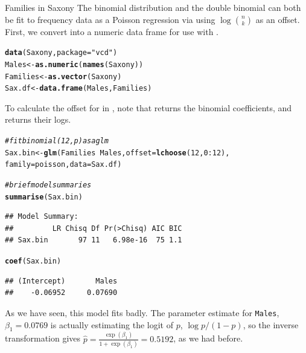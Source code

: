 \documentclass[11pt]{book}\usepackage[]{graphicx}\usepackage[]{color}
\makeatletter
\newcommand{\hlnum}[1]{\textcolor[rgb]{0.686,0.059,0.569}{#1}}%
\newcommand{\hlstr}[1]{\textcolor[rgb]{0.192,0.494,0.8}{#1}}%
\newcommand{\hlcom}[1]{\textcolor[rgb]{0.678,0.584,0.686}{\textit{#1}}}%
\newcommand{\hlopt}[1]{\textcolor[rgb]{0,0,0}{#1}}%
\newcommand{\hlstd}[1]{\textcolor[rgb]{0.345,0.345,0.345}{#1}}%
\newcommand{\hlkwb}[1]{\textcolor[rgb]{0.69,0.353,0.396}{#1}}%
\newcommand{\hlkwc}[1]{\textcolor[rgb]{0.333,0.667,0.333}{#1}}%
\newcommand{\hlkwd}[1]{\textcolor[rgb]{0.737,0.353,0.396}{\textbf{#1}}}%
\newenvironment{kframe}{%
 \def\at@end@of@kframe{}%
 \ifinner\ifhmode%
  \def\at@end@of@kframe{\end{minipage}}%
  \begin{minipage}{\columnwidth}%
 \fi\fi%
 \def\FrameCommand##1{\hskip\@totalleftmargin \hskip-\fboxsep
 \colorbox{shadecolor}{##1}\hskip-\fboxsep
     \hskip-\linewidth \hskip-\@totalleftmargin \hskip\columnwidth}%
 \MakeFramed {\advance\hsize-\width
   \@totalleftmargin\z@ \linewidth\hsize
   \@setminipage}}%
 {\par\unskip\endMakeFramed%
 \at@end@of@kframe}
\newenvironment{knitrout}{}{} %
\renewenvironment{knitrout}{\small\renewcommand{\baselinestretch}{.85}}{} %
\makeatother
\begin{document}
\begin{Example}[saxony2]{Families in Saxony}
The binomial distribution and the double binomial can both be fit to frequency data as a Poisson regression via 
using $\log \binom{n}{k}$ as an offset. 
First, we convert  into a numeric data frame for use with .
\begin{knitrout}
\color{fgcolor}\begin{kframe}
\begin{alltt}
\hlkwd{data}\hlstd{(Saxony,} \hlkwc{package}\hlstd{=}\hlstr{"vcd"}\hlstd{)}
\hlstd{Males} \hlkwb{<-} \hlkwd{as.numeric}\hlstd{(}\hlkwd{names}\hlstd{(Saxony))}
\hlstd{Families} \hlkwb{<-} \hlkwd{as.vector}\hlstd{(Saxony)}
\hlstd{Sax.df} \hlkwb{<-} \hlkwd{data.frame}\hlstd{(Males, Families)}
\end{alltt}
\end{kframe}
\end{knitrout}

To calculate the offset  for  in \R, 
note that  returns the
binomial coefficients, and  returns their logs.
\begin{knitrout}
\color{fgcolor}\begin{kframe}
\begin{alltt}
\hlcom{# fit binomial (12, p) as a glm}
\hlstd{Sax.bin} \hlkwb{<-} \hlkwd{glm}\hlstd{(Families} \hlopt{~} \hlstd{Males,} \hlkwc{offset}\hlstd{=}\hlkwd{lchoose}\hlstd{(}\hlnum{12}\hlstd{,}\hlnum{0}\hlopt{:}\hlnum{12}\hlstd{),}
               \hlkwc{family}\hlstd{=poisson,} \hlkwc{data}\hlstd{=Sax.df)}

\hlcom{# brief model summaries}
\hlkwd{summarise}\hlstd{(Sax.bin)}
\end{alltt}
\begin{verbatim}
## Model Summary:
##         LR Chisq Df Pr(>Chisq) AIC BIC
## Sax.bin       97 11   6.98e-16  75 1.1
\end{verbatim}
\begin{alltt}
\hlkwd{coef}\hlstd{(Sax.bin)}
\end{alltt}
\begin{verbatim}
## (Intercept)       Males 
##    -0.06952     0.07690
\end{verbatim}
\end{kframe}
\end{knitrout}

As we have seen, this model fits badly.  
The parameter estimate for \texttt{Males}, $\beta_1 = 0.0769$
is actually estimating the logit of $p$, $\log p / (1-p)$,
so the inverse transformation gives
$\hat{p} = \frac{\exp (\beta_1)}{1 + \exp (\beta_1)} = 0.5192$,
as we had before.



\end{Example}
\end{document}
